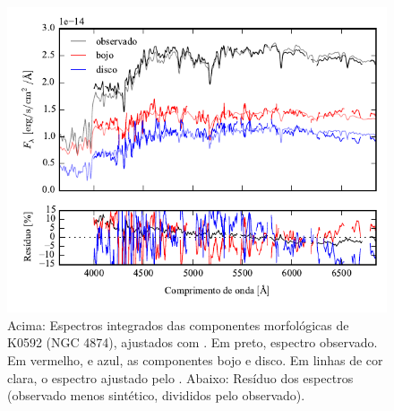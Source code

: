 \begin{figure}
	\includegraphics[page=5]{figuras/sample006a_synthesis}
	\caption[Espectros ajustados com \starlight das componentes morfológicas de
	K0592 (NGC 4874)]
	{Acima: Espectros integrados das componentes morfológicas de
	K0592 (NGC 4874), ajustados com \starlight. Em preto, espectro observado. Em
	vermelho, e azul, as componentes bojo e disco. Em linhas de cor clara, o
	espectro ajustado pelo \starlight. Abaixo: Resíduo dos espectros (observado
	menos sintético, divididos pelo observado).}
	\label{fig:decompSintese:K0592}
\end{figure}

